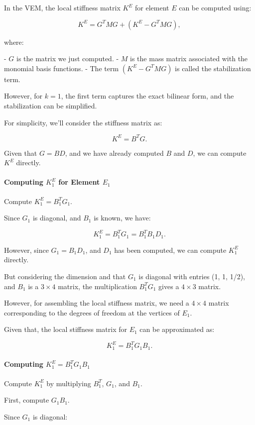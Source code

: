 \documentclass[class=article, crop=false]{standalone}
\begin{document}
In the VEM, the local stiffness matrix $K^E$ for element $E$ can be computed using:

\[
K^E = G^T M G + \left( K^E - G^T M G \right),
\]

where:

- $G$ is the matrix we just computed.
- $M$ is the mass matrix associated with the monomial basis functions.
- The term $\left( K^E - G^T M G \right)$ is called the stabilization term.

However, for $k = 1$, the first term captures the exact bilinear form, and the stabilization can be simplified.

For simplicity, we'll consider the stiffness matrix as:

\[
K^E = B^T G.
\]

Given that $G = B D$, and we have already computed $B$ and $D$, we can compute $K^E$ directly.

\paragraph{Computing $K_1^E$ for Element $E_1$}

Compute $K_1^E = B_1^T G_1$.

Since $G_1$ is diagonal, and $B_1$ is known, we have:

\[
K_1^E = B_1^T G_1 = B_1^T B_1 D_1.
\]

However, since $G_1 = B_1 D_1$, and $D_1$ has been computed, we can compute $K_1^E$ directly.

But considering the dimension and that $G_1$ is diagonal with entries (1, 1, 1/2), and $B_1$ is a $3 \times 4$ matrix, the multiplication $B_1^T G_1$ gives a $4 \times 3$ matrix.

However, for assembling the local stiffness matrix, we need a $4 \times 4$ matrix corresponding to the degrees of freedom at the vertices of $E_1$.

Given that, the local stiffness matrix for $E_1$ can be approximated as:

\[
K_1^E = B_1^T G_1 B_1.
\]

\paragraph{Computing $K_1^E = B_1^T G_1 B_1$}

Compute $K_1^E$ by multiplying $B_1^T$, $G_1$, and $B_1$.

First, compute $G_1 B_1$.

Since $G_1$ is diagonal:
\end{document}
